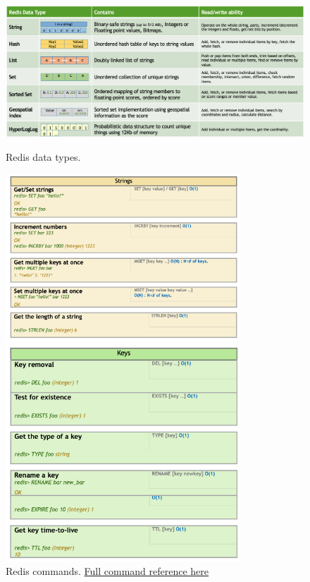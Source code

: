 \documentclass[10pt,a4paper]{article}
\begin{document}
\begin{figure}[ht!]
	\centering
	 \hfill \includegraphics[width=350pt]{images/redis-datatypes.png}\hspace*{\fill}
 \caption{Redis data types.}
 
 	\vspace{2em}
  \centering
  \hfill \includegraphics[width=250pt]{images/redis-commands1.png}\hspace*{\fill}

  \vspace{0.5em}

  \hfill \includegraphics[width=250pt]{images/redis-commands2.png}\hspace*{\fill}
 \caption{Redis commands. \href{https://redis.io/commands}{Full command reference here}}
\end{figure} 
\clearpage
\end{document}
